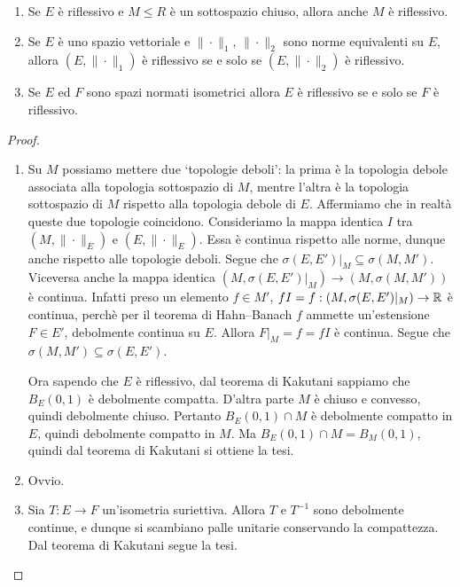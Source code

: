 \begin{lemma}
	\leavevmode
	\begin{enumerate}
		\item Se $E$ è riflessivo e $M \leq R$ è un sottospazio chiuso, allora anche $M$ è riflessivo.
		\item Se $E$ è uno spazio vettoriale e $\|\cdot\|_1$, $\|\cdot\|_2$ sono norme equivalenti su $E$, allora $(E, \|\cdot\|_1)$ è riflessivo se e solo se $(E, \|\cdot\|_2)$ è riflessivo.
		\item Se $E$ ed $F$ sono spazi normati isometrici allora $E$ è riflessivo se e solo se $F$ è riflessivo.
	\end{enumerate}
\end{lemma}
\begin{proof}
	\leavevmode
	\begin{enumerate}
		\item Su $M$ possiamo mettere due `topologie deboli': la prima è la topologia debole associata alla topologia sottospazio di $M$, mentre l'altra è la topologia sottospazio di $M$ rispetto alla topologia debole di $E$. Affermiamo che in realtà queste due topologie coincidono. Consideriamo la mappa identica $I$ tra $(M, \|\cdot\|_E)$ e $(E, \|\cdot\|_E)$. Essa è continua rispetto alle norme, dunque anche rispetto alle topologie deboli. Segue che $\sigma(E,E')\vert_M \subseteq \sigma(M,M')$. Viceversa anche la mappa identica $(M, \sigma(E,E')\vert_M) \to (M, \sigma(M,M'))$ è continua. Infatti preso un elemento $f \in M'$, $fI = f : (M, \sigma(E,E')\vert_M) \to \mathbb{R}$ è continua, perchè per il teorema di Hahn--Banach $f$ ammette un'estensione $F \in E'$, debolmente continua su $E$. Allora $F\vert_M = f = fI$ è continua. Segue che $\sigma(M,M') \subseteq \sigma(E,E')$.

		Ora sapendo che $E$ è riflessivo, dal teorema di Kakutani sappiamo che $B_E(0,1)$ è debolmente compatta. D'altra parte $M$ è chiuso e convesso, quindi debolmente chiuso. Pertanto $B_E(0,1) \cap M$ è debolmente compatto in $E$, quindi debolmente compatto in $M$. Ma $B_E(0, 1) \cap M = B_M(0,1)$, quindi dal teorema di Kakutani si ottiene la tesi.

		\item Ovvio.

		\item Sia $T:E \to F$ un'isometria suriettiva. Allora $T$ e $T^{-1}$ sono debolmente continue, e dunque si scambiano palle unitarie conservando la compattezza. Dal teorema di Kakutani segue la tesi.
	\end{enumerate}
\end{proof}

